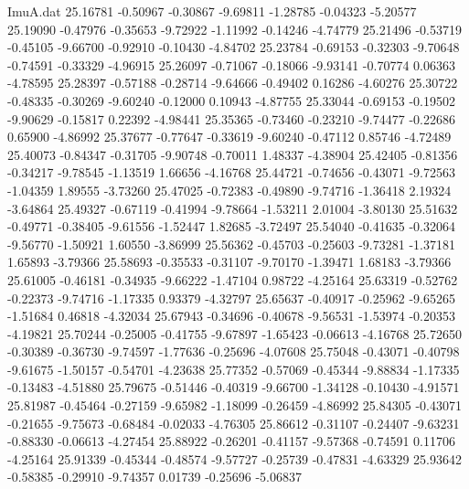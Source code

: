 \begin{filecontents}{ImuA.dat}
  25.16781   -0.50967   -0.30867   -9.69811   -1.28785   -0.04323   -5.20577
  25.19090   -0.47976   -0.35653   -9.72922   -1.11992   -0.14246   -4.74779
  25.21496   -0.53719   -0.45105   -9.66700   -0.92910   -0.10430   -4.84702
  25.23784   -0.69153   -0.32303   -9.70648   -0.74591   -0.33329   -4.96915
  25.26097   -0.71067   -0.18066   -9.93141   -0.70774    0.06363   -4.78595
  25.28397   -0.57188   -0.28714   -9.64666   -0.49402    0.16286   -4.60276
  25.30722   -0.48335   -0.30269   -9.60240   -0.12000    0.10943   -4.87755
  25.33044   -0.69153   -0.19502   -9.90629   -0.15817    0.22392   -4.98441
  25.35365   -0.73460   -0.23210   -9.74477   -0.22686    0.65900   -4.86992
  25.37677   -0.77647   -0.33619   -9.60240   -0.47112    0.85746   -4.72489
  25.40073   -0.84347   -0.31705   -9.90748   -0.70011    1.48337   -4.38904
  25.42405   -0.81356   -0.34217   -9.78545   -1.13519    1.66656   -4.16768
  25.44721   -0.74656   -0.43071   -9.72563   -1.04359    1.89555   -3.73260
  25.47025   -0.72383   -0.49890   -9.74716   -1.36418    2.19324   -3.64864
  25.49327   -0.67119   -0.41994   -9.78664   -1.53211    2.01004   -3.80130
  25.51632   -0.49771   -0.38405   -9.61556   -1.52447    1.82685   -3.72497
  25.54040   -0.41635   -0.32064   -9.56770   -1.50921    1.60550   -3.86999
  25.56362   -0.45703   -0.25603   -9.73281   -1.37181    1.65893   -3.79366
  25.58693   -0.35533   -0.31107   -9.70170   -1.39471    1.68183   -3.79366
  25.61005   -0.46181   -0.34935   -9.66222   -1.47104    0.98722   -4.25164
  25.63319   -0.52762   -0.22373   -9.74716   -1.17335    0.93379   -4.32797
  25.65637   -0.40917   -0.25962   -9.65265   -1.51684    0.46818   -4.32034
  25.67943   -0.34696   -0.40678   -9.56531   -1.53974   -0.20353   -4.19821
  25.70244   -0.25005   -0.41755   -9.67897   -1.65423   -0.06613   -4.16768
  25.72650   -0.30389   -0.36730   -9.74597   -1.77636   -0.25696   -4.07608
  25.75048   -0.43071   -0.40798   -9.61675   -1.50157   -0.54701   -4.23638
  25.77352   -0.57069   -0.45344   -9.88834   -1.17335   -0.13483   -4.51880
  25.79675   -0.51446   -0.40319   -9.66700   -1.34128   -0.10430   -4.91571
  25.81987   -0.45464   -0.27159   -9.65982   -1.18099   -0.26459   -4.86992
  25.84305   -0.43071   -0.21655   -9.75673   -0.68484   -0.02033   -4.76305
  25.86612   -0.31107   -0.24407   -9.63231   -0.88330   -0.06613   -4.27454
  25.88922   -0.26201   -0.41157   -9.57368   -0.74591    0.11706   -4.25164
  25.91339   -0.45344   -0.48574   -9.57727   -0.25739   -0.47831   -4.63329
  25.93642   -0.58385   -0.29910   -9.74357    0.01739   -0.25696   -5.06837

\end{filecontents}
